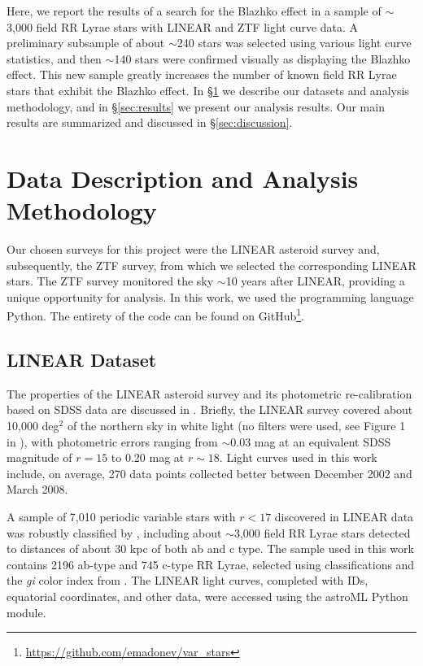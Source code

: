 \documentclass{aa}
\begin{document}
Here, we report the results of a search for the Blazhko effect in a sample of $\sim$3,000 field RR Lyrae stars with
LINEAR and ZTF light curve data. A preliminary subsample of about $\sim$240 stars was selected using various
light curve statistics, and then $\sim$140 stars were confirmed visually as displaying the Blazhko effect. This new
sample greatly increases the number of known field RR Lyrae stars that exhibit the Blazhko effect. In \S\ref{sec:analysis}
we describe our datasets and analysis methodology, and in \S\ref{sec:results} we present our analysis results. 
Our main results are summarized and discussed in \S\ref{sec:discussion}.

\section{Data Description and Analysis Methodology}\label{sec:analysis}
Our chosen surveys for this project were the LINEAR asteroid survey and, subsequently, the ZTF survey, 
from which we selected the corresponding LINEAR stars. The ZTF survey monitored the sky $\sim$10 years after LINEAR, providing a unique opportunity for analysis. In this work, we used the programming language Python. The entirety of the code can be found on GitHub\footnote{\url{https://github.com/emadonev/var_stars}}.  


\subsection{LINEAR Dataset}

The properties of the LINEAR asteroid survey and its photometric re-calibration based on SDSS data are discussed in \cite{2011AJ....142..190S}.
Briefly, the LINEAR survey covered about 10,000 deg$^2$ of the northern sky in white light (no filters were used, see Figure 1 in \citealt{2011AJ....142..190S}),
with photometric errors ranging from $\sim$0.03 mag at an equivalent SDSS magnitude of $r=15$ to 0.20 mag at $r\sim18$. Light curves used
in this work include, on average, 270 data points collected better between December 2002 and March 2008.
 
A sample of 7,010 periodic variable stars with $r<17$ discovered in LINEAR data was robustly classified by \cite{2013AJ....146..101P}, including
about $\sim$3,000 field RR Lyrae stars detected to distances of about 30 kpc \citep{2013AJ....146...21S} of both ab and c type. The sample used in this work contains 2196 ab-type and 745 c-type RR Lyrae, selected using classifications and the {\it gi} color index from \cite{2013AJ....146..101P}.
The LINEAR light curves, completed with IDs, equatorial coordinates, and other data, were accessed using the astroML Python module.
\end{document}

